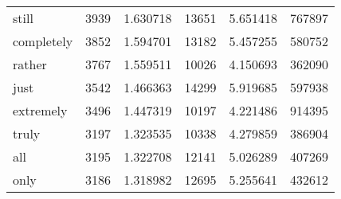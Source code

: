 \begin{table}[ht]
\begin{tabular}{lrrrrr}
still & {\cellcolor[HTML]{E5EFF6}} \color[HTML]{000000} 3939 & {\cellcolor[HTML]{E5EFF6}} \color[HTML]{000000} 1.630718 & {\cellcolor[HTML]{E8F1F7}} \color[HTML]{000000} 13651 & {\cellcolor[HTML]{E8F1F7}} \color[HTML]{000000} 5.651418 & {\cellcolor[HTML]{EBF4F8}} \color[HTML]{000000} 767897 \\
completely & {\cellcolor[HTML]{E6F0F7}} \color[HTML]{000000} 3852 & {\cellcolor[HTML]{E6F0F7}} \color[HTML]{000000} 1.594701 & {\cellcolor[HTML]{E9F2F8}} \color[HTML]{000000} 13182 & {\cellcolor[HTML]{E9F2F8}} \color[HTML]{000000} 5.457255 & {\cellcolor[HTML]{F0F7FA}} \color[HTML]{000000} 580752 \\
rather & {\cellcolor[HTML]{E8F1F7}} \color[HTML]{000000} 3767 & {\cellcolor[HTML]{E8F1F7}} \color[HTML]{000000} 1.559511 & {\cellcolor[HTML]{F5FAFC}} \color[HTML]{000000} 10026 & {\cellcolor[HTML]{F5FAFC}} \color[HTML]{000000} 4.150693 & {\cellcolor[HTML]{F4FAFC}} \color[HTML]{000000} 362090 \\
just & {\cellcolor[HTML]{ECF4F9}} \color[HTML]{000000} 3542 & {\cellcolor[HTML]{ECF4F9}} \color[HTML]{000000} 1.466363 & {\cellcolor[HTML]{E6F0F6}} \color[HTML]{000000} 14299 & {\cellcolor[HTML]{E6F0F6}} \color[HTML]{000000} 5.919685 & {\cellcolor[HTML]{EFF6FA}} \color[HTML]{000000} 597938 \\
extremely & {\cellcolor[HTML]{EDF5F9}} \color[HTML]{000000} 3496 & {\cellcolor[HTML]{EDF5F9}} \color[HTML]{000000} 1.447319 & {\cellcolor[HTML]{F4FAFC}} \color[HTML]{000000} 10197 & {\cellcolor[HTML]{F4FAFC}} \color[HTML]{000000} 4.221486 & {\cellcolor[HTML]{E9F2F7}} \color[HTML]{000000} 914395 \\
truly & {\cellcolor[HTML]{F3F9FB}} \color[HTML]{000000} 3197 & {\cellcolor[HTML]{F3F9FB}} \color[HTML]{000000} 1.323535 & {\cellcolor[HTML]{F3F9FC}} \color[HTML]{000000} 10338 & {\cellcolor[HTML]{F3F9FC}} \color[HTML]{000000} 4.279859 & {\cellcolor[HTML]{F3F9FC}} \color[HTML]{000000} 386904 \\
all & {\cellcolor[HTML]{F3F9FB}} \color[HTML]{000000} 3195 & {\cellcolor[HTML]{F3F9FB}} \color[HTML]{000000} 1.322708 & {\cellcolor[HTML]{EDF5F9}} \color[HTML]{000000} 12141 & {\cellcolor[HTML]{EDF5F9}} \color[HTML]{000000} 5.026289 & {\cellcolor[HTML]{F3F9FC}} \color[HTML]{000000} 407269 \\
only & {\cellcolor[HTML]{F3F9FC}} \color[HTML]{000000} 3186 & {\cellcolor[HTML]{F3F9FC}} \color[HTML]{000000} 1.318982 & {\cellcolor[HTML]{EBF4F8}} \color[HTML]{000000} 12695 & {\cellcolor[HTML]{EBF4F8}} \color[HTML]{000000} 5.255641 & {\cellcolor[HTML]{F3F9FB}} \color[HTML]{000000} 432612 \\

\end{tabular}
\end{table}
